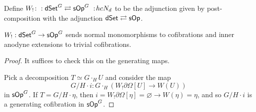\documentclass[a4paper,10pt
,draft
]{article}%
\renewcommand{\1}{\eta}%
\begin{document}
\begin{definition}
      Define $W_!\colon: \mathsf{dSet}^G \rightleftarrows \mathsf{sOp}^G\ :\! hcN_d$ to be the adjunction
      given by post-composition with the adjunction $\mathsf{dSet} \rightleftarrows \mathsf{sOp}$.
\end{definition}

\begin{proposition}[{cf. \cite[Prop. 4.5]{CM11}}]
      \label{W!_COF_PROP}
      $W_!: \mathsf{dSet}^G \to \mathsf{sOp}^G$ sends normal monomorphisms to cofibrations and inner anodyne extensions to trivial cofibrations.
\end{proposition}
\begin{proof}
      It suffices to check this on the generating maps.

      Pick a decomposition $T \simeq G \cdot_H U$ and consider the map
      \begin{equation}
            G/H \cdot i: G \cdot_H \left( W_! \partial \Omega[U] \to W(U) \right)      
      \end{equation}
      in $\mathsf{sOp}^G$.
      If $T = G/H \cdot \eta$, then $i = W_! \partial \Omega[\eta] = \varnothing \to W(\eta) = \eta$,
      and so $G/H \cdot i$ is a generating cofibration in $\mathsf{sOp}^G$.


\end{proof}
\end{document}
